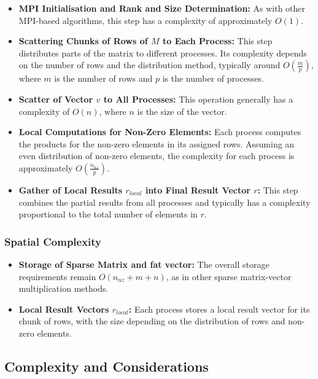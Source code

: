 \documentclass[12pt,oneside]{book} %
\begin{document}
\begin{itemize}
    \item \textbf{MPI Initialisation and Rank and Size Determination:} As with other MPI-based algorithms, this step has a complexity of approximately \( O(1) \).

    \item \textbf{Scattering Chunks of Rows of \( M \) to Each Process:} This step distributes parts of the matrix to different processes. Its complexity depends on the number of rows and the distribution method, typically around \( O(\frac{m}{p}) \), where \( m \) is the number of rows and \( p \) is the number of processes.

    \item \textbf{Scatter of Vector \( v \) to All Processes:} This operation generally has a complexity of \( O(n) \), where \( n \) is the size of the vector.

    \item \textbf{Local Computations for Non-Zero Elements:} Each process computes the products for the non-zero elements in its assigned rows. Assuming an even distribution of non-zero elements, the complexity for each process is approximately \( O(\frac{n_{nz}}{p}) \).

    \item \textbf{Gather of Local Results \( r_{local} \) into Final Result Vector \( r \):} This step combines the partial results from all processes and typically has a complexity proportional to the total number of elements in \( r \).
\end{itemize}

\subsubsection{Spatial Complexity}

\begin{itemize}
    \item \textbf{Storage of Sparse Matrix and fat vector:} The overall storage requirements remain \( O(n_{nz} + m + n) \), as in other sparse matrix-vector multiplication methods.

    \item \textbf{Local Result Vectors \( r_{local} \):} Each process stores a local result vector for its chunk of rows, with the size depending on the distribution of rows and non-zero elements.
\end{itemize}

\subsection*{Complexity and Considerations}
\end{document}
